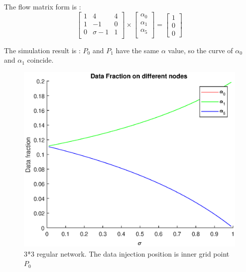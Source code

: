 The flow matrix form is :
\begin{equation}
{
\left[ \begin{array}{ccc}
1 & 4 & 4 \\
1 & -1 & 0\\
0 & \sigma-1 & 1\\
\end{array} 
\right ]} \times \left[ \begin{array}{c}
\alpha_{0} \\
\alpha_{1} \\
\alpha_{5} \\
\end{array} 
\right ] = \left[ \begin{array}{c}
1 \\
0 \\
0 
\end{array} 
\right ]
\end{equation}
\newpage 

The simulation result is :
$P_{0}$ and $P_{1}$ have the same $\alpha$ value, so the curve of $\alpha_{0}$ and $\alpha_{1}$ coincide.  

\begin{figure}[!ht]
\centering
\includegraphics[width=1\columnwidth]{figure/3t3ifraction.eps}
\caption{3*3 regular network.  The data injection position is inner grid point $P_{0}$}
\label{fig:3t3ifraction}
\end{figure}
